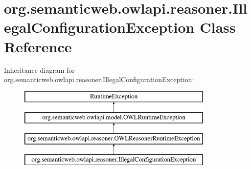 \hypertarget{classorg_1_1semanticweb_1_1owlapi_1_1reasoner_1_1_illegal_configuration_exception}{\section{org.\-semanticweb.\-owlapi.\-reasoner.\-Illegal\-Configuration\-Exception Class Reference}
\label{classorg_1_1semanticweb_1_1owlapi_1_1reasoner_1_1_illegal_configuration_exception}
}
Inheritance diagram for org.\-semanticweb.\-owlapi.\-reasoner.\-Illegal\-Configuration\-Exception\-:\begin{figure}[H]
\begin{center}
\leavevmode
\includegraphics[height=4.000000cm]{classorg_1_1semanticweb_1_1owlapi_1_1reasoner_1_1_illegal_configuration_exception}
\end{center}
\end{figure}
